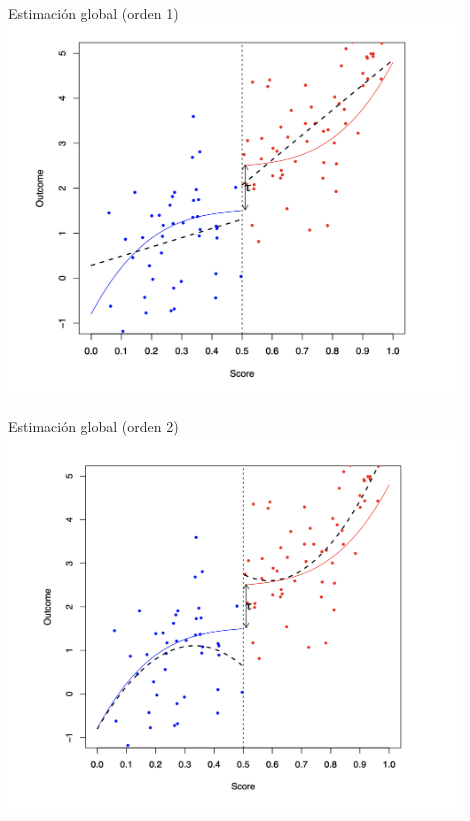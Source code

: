 \documentclass[
  ignorenonframetext,
]{beamer}
\begin{document}
\begin{frame}{Estimación global (orden 1)}
\protect\hypertarget{estimaciuxf3n-global-orden-1}{}
\includegraphics[width=0.9\textwidth,height=\textheight]{p1}
\end{frame}

\begin{frame}{Estimación global (orden 2)}
\protect\hypertarget{estimaciuxf3n-global-orden-2}{}
\includegraphics[width=0.9\textwidth,height=\textheight]{p2}
\end{frame}
\end{document}
